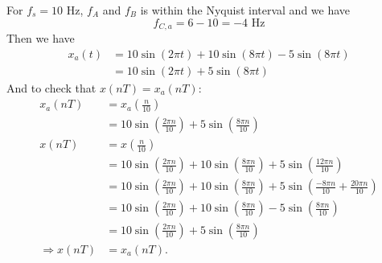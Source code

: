 \begin{itemize}
For $f_s = 10$ Hz, $f_A$ and $f_B$ is within the Nyquist interval and we
have
\begin{equation*}
	f_{C,a} = 6 - 10 = -4 \text{ Hz}
\end{equation*}
Then we have
\begin{align*}
	x_a(t) &= 10\sin(2\pi t) + 10\sin(8\pi t) - 5\sin(8\pi t) \\
		   &= 10\sin(2\pi t) + 5\sin(8\pi t)
\end{align*}
And to check that $x(nT) = x_a(nT)$:
\begin{align*}
	x_a(nT) &= x_a\left(\frac{n}{10}\right) \\
			&= 10\sin\left(\frac{2\pi n}{10}\right) + 5\sin\left(\frac{8\pi n}{10}\right) \\
	x(nT) 	&= x\left(\frac{n}{10}\right) \\
			&= 10\sin\left(\frac{2\pi n}{10}\right) + 10\sin\left(\frac{8\pi n}{10}\right) + 5\sin\left(\frac{12\pi n}{10}\right) \\
			&= 10\sin\left(\frac{2\pi n}{10}\right) + 10\sin\left(\frac{8\pi n}{10}\right) + 5\sin\left(\frac{-8\pi n}{10} + \frac{20\pi n}{10}\right) \\
			&= 10\sin\left(\frac{2\pi n}{10}\right) + 10\sin\left(\frac{8\pi n}{10}\right) - 5\sin\left(\frac{8\pi n}{10}\right) \\
			&= 10\sin\left(\frac{2\pi n}{10}\right) + 5\sin\left(\frac{8\pi n}{10}\right) \\
	\Rightarrow x(nT) &= x_a(nT)\text{.}
\end{align*}

\end{itemize}
